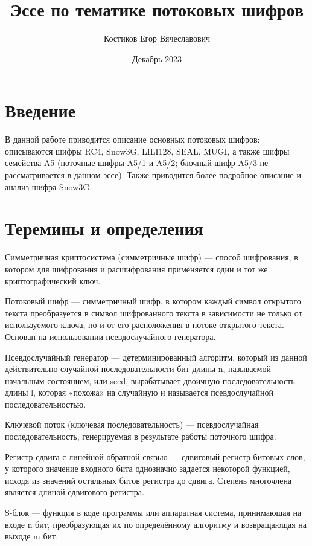 \documentclass{./civarticle}
\title{Эссе по тематике потоковых шифров}
\author{Костиков Егор Вячеславович}
\date{Декабрь 2023}
\begin{document}
\maketitle

\section{Введение}

В данной работе приводится описание основных потоковых шифров: описываются шифры RC4, Snow3G, LILI128, SEAL, MUGI, а также шифры семейства A5 (поточные шифры A5/1 и A5/2; блочный шифр A5/3 не рассматривается в данном эссе). Также приводится более подробное описание и анализ шифра Snow3G.

\section{Теремины и определения}

Симметричная криптосистема (симметричные шифр) --- способ шифрования, в котором для шифрования и расшифрования применяется один и тот же криптографический ключ.

Потоковый шифр ---  симметричный шифр, в котором каждый символ открытого текста преобразуется в символ шифрованного текста в зависимости не только от используемого ключа, но и от его расположения в потоке открытого текста. Основан на использовании псевдослучайного генератора.

Псевдослучайный генератор --- детерминированный алгоритм, который из данной действительно случайной последовательности бит длины n, называемой начальным состоянием, или seed, вырабатывает двоичную последовательность длины l, которая «похожа» на случайную и называется псевдослучайной последовательностью.

Ключевой поток (ключевая последовательность) --- псевдослучайная последовательность, генерируемая в результате работы поточного шифра.

Регистр сдвига с линейной обратной связью --- сдвиговый регистр битовых слов, у которого значение входного бита однозначно задается некоторой функцией, исходя из значений остальных битов регистра до сдвига. Степень многочлена является длиной сдвигового регистра.

S-блок ---  функция в коде программы или аппаратная система, принимающая на входе n бит, преобразующая их по определённому алгоритму и возвращающая на выходе m бит.
\end{document}
